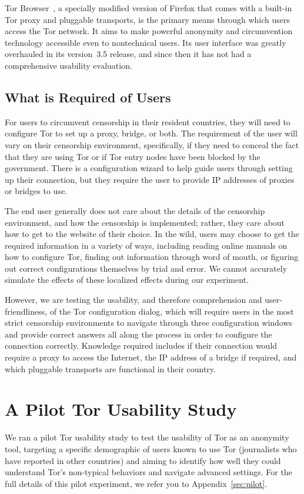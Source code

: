 \documentclass[letterpaper,twocolumn,11pt]{article}
\begin{document}
Tor Browser~\cite{tor-browser},
a specially modified version of Firefox that comes
with a built-in Tor proxy and pluggable transports,
is the primary means through which users access the Tor network.
It aims to make powerful anonymity and circumvention technology
accessible even to nontechnical users.
Its user interface was greatly overhauled in its version~3.5 release,
and since then it has not had a comprehensive usability evaluation.

\subsection{What is Required of Users}
\indent \indent For users to circumvent censorship in their resident countries, they will need to 
configure Tor to set up a proxy, bridge, or both. The requirement of the user will vary on their censorship
environment, specifically, if they need to conceal the fact that they are using Tor or if Tor entry nodes 
have been blocked by the government. There is a configuration wizard to help guide users through setting up their connection, but they require the user to provide IP addresses of proxies or bridges to use.

The end user generally does not care about the details of the 
censorship environment, and how the censorship is implemented; rather, they care about how to get
to the website of their choice. In the wild, users may choose to get the required information in a variety 
of ways, including reading online manuals on how to configure Tor, finding out information through word of mouth, 
or figuring out correct configurations themselves by trial and error.  We cannot accurately simulate the effects
of these localized effects during our experiment.

However, we are testing the usability, and therefore comprehension and user-friendliness, of the Tor configuration 
dialog, which will require users in the most strict censorship environments to navigate through three configuration windows and provide correct answers all along the process in order to configure the connection correctly. Knowledge
required includes if their connection would require a proxy to access the Internet, the IP address of a bridge if required, 
and which pluggable transports are functional in their country. 

\section{A Pilot Tor Usability Study} 
\indent \indent We ran a pilot Tor usability study to test the usability of Tor as an anonymity tool,
targeting a specific demographic of users known to use Tor (journalists who have reported in other
countries) and aiming to identify how well they could understand Tor's non-typical behaviors and 
navigate advanced settings. For the full details of this pilot experiment, we refer you to Appendix~\ref{sec:pilot}.  
\end{document}
